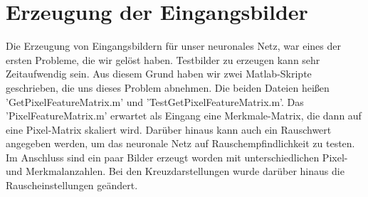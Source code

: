 \section{Erzeugung der Eingangsbilder}

Die Erzeugung von Eingangsbildern für unser neuronales Netz, war eines der ersten Probleme, die wir gelöst haben. Testbilder zu erzeugen kann sehr Zeitaufwendig sein. Aus diesem Grund haben wir zwei Matlab-Skripte geschrieben, die uns dieses Problem abnehmen. Die beiden Dateien heißen 'GetPixelFeatureMatrix.m' und 'TestGetPixelFeatureMatrix.m'. Das 'PixelFeatureMatrix.m' erwartet als Eingang eine Merkmale-Matrix, die dann auf eine Pixel-Matrix skaliert wird. Darüber hinaus kann auch ein Rauschwert angegeben werden, um das neuronale Netz auf Rauschempfindlichkeit zu testen. Im Anschluss sind ein paar Bilder erzeugt worden mit unterschiedlichen Pixel- und Merkmalanzahlen. Bei den Kreuzdarstellungen wurde darüber hinaus die Rauscheinstellungen geändert.

